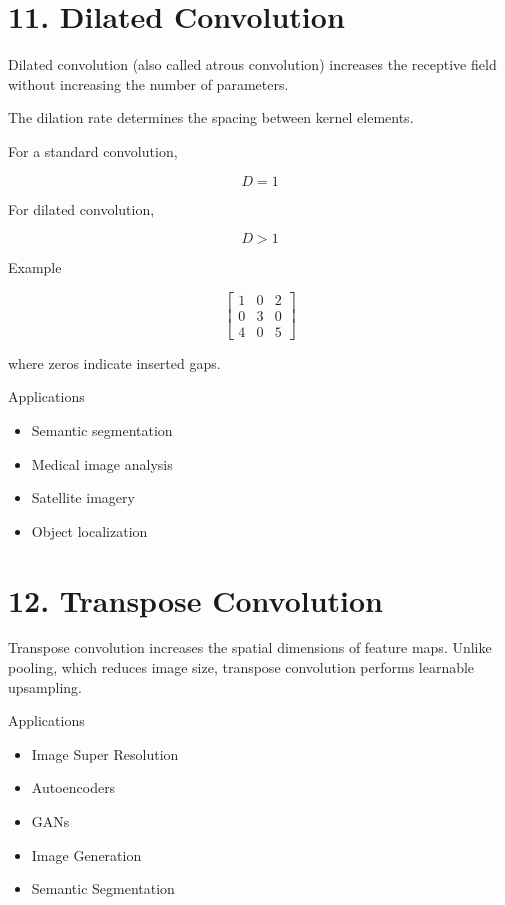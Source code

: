 \documentclass[11pt]{article}
\begin{document}

\section*{11. Dilated Convolution}

Dilated convolution (also called atrous convolution) increases the
receptive field without increasing the number of parameters.

The dilation rate determines the spacing between kernel elements.

For a standard convolution,

\[
D=1
\]

For dilated convolution,

\[
D>1
\]

Example

\[
\begin{bmatrix}
1 & 0 & 2\\
0 & 3 & 0\\
4 & 0 & 5
\end{bmatrix}
\]

where zeros indicate inserted gaps.

Applications

\begin{itemize}
\item Semantic segmentation
\item Medical image analysis
\item Satellite imagery
\item Object localization
\end{itemize}


\section*{12. Transpose Convolution}

Transpose convolution increases the spatial dimensions of feature maps.
Unlike pooling, which reduces image size, transpose convolution performs
learnable upsampling.

Applications

\begin{itemize}
\item Image Super Resolution
\item Autoencoders
\item GANs
\item Image Generation
\item Semantic Segmentation
\end{itemize}
\end{document}
